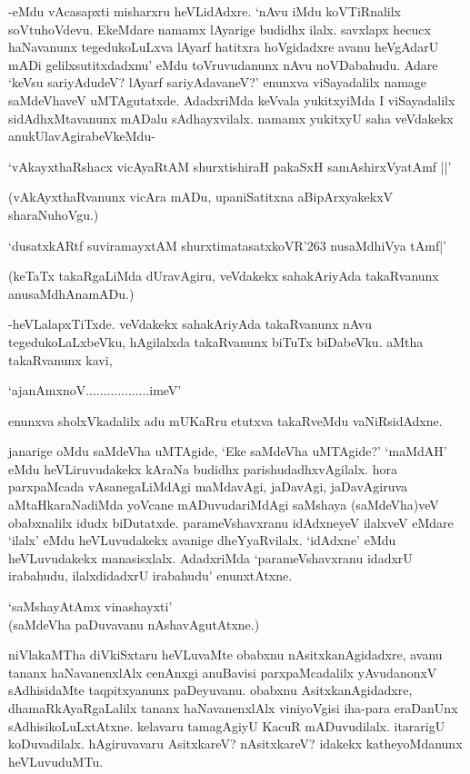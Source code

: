 -eMdu vAcasapxti misharxru heVLidAdxre. `nAvu iMdu koVTiRnalilx soVtuhoVdevu. EkeMdare namamx lAyarige budidhx ilalx. savxlapx hecucx haNavanunx tegedukoLuLxva lAyarf hatitxra hoVgidadxre avanu heVgAdarU mADi gelilxsutitxdadxnu' eMdu toVruvudanunx nAvu noVDabahudu. Adare `keVsu sariyAdudeV? lAyarf sariyAdavaneV?' enunxva viSayadalilx namage saMdeVhaveV uMTAgutatxde. AdadxriMda keVvala yukitxyiMda I viSayadalilx sidAdhxMtavanunx mADalu sAdhayxvilalx. namamx yukitxyU saha veVdakekx anukUlavAgirabeVkeMdu-

\begin{shloka}
`vAkayxthaRshacx vicAyaRtAM shurxtishiraH pakaSxH samAshirxVyatAmf ||'
\end{shloka}

(vAkAyxthaRvanunx vicAra mADu, upaniSatitxna aBipArxyakekxV sharaNuhoVgu.)

\begin{shloka}
`dusatxkARtf suviramayxtAM shurxtimatasatxkoVR\char'263 nusaMdhiVya tAmf|'
\end{shloka}

(keTaTx takaRgaLiMda dUravAgiru, veVdakekx sahakAriyAda takaRvanunx anusaMdhAnamADu.)

-heVLalapxTiTxde. veVdakekx sahakAriyAda takaRvanunx nAvu tegedukoLaLxbeVku, hAgilalxda takaRvanunx biTuTx biDabeVku. aMtha takaRvanunx kavi,

\begin{shloka}
`ajanAmxnoV..................imeV'
\end{shloka}

enunxva sholxVkadalilx adu mUKaRru etutxva takaRveMdu vaNiRsidAdxne.

janarige oMdu saMdeVha uMTAgide, `Eke saMdeVha uMTAgide?' `maMdAH' eMdu heVLiruvudakekx kAraNa budidhx parishudadhxvAgilalx. hora parxpaMcada vAsanegaLiMdAgi maMdavAgi, jaDavAgi, jaDavAgiruva aMtaHkaraNadiMda yoVcane mADuvudariMdAgi saMshaya (saMdeVha)veV obabxnalilx idudx biDutatxde. parameVshavxranu idAdxneyeV ilalxveV eMdare `ilalx' eMdu heVLuvudakekx avanige dheYyaRvilalx. `idAdxne' eMdu heVLuvudakekx manasisxlalx. AdadxriMda `parameVshavxranu idadxrU irabahudu, ilalxdidadxrU irabahudu' enunxtAtxne.

\begin{shloka}
`saMshayAtAmx vinashayxti'\\
(saMdeVha paDuvavanu nAshavAgutAtxne.)
\end{shloka}

niVlakaMTha diVkiSxtaru heVLuvaMte obabxnu nAsitxkanAgidadxre, avanu tananx haNavanenxlAlx cenAnxgi anuBavisi parxpaMcadalilx yAvudanonxV sAdhisidaMte taqpitxyanunx paDeyuvanu. obabxnu AsitxkanAgidadxre, dhamaRkAyaRgaLalilx tananx haNavanenxlAlx viniyoVgisi iha-para eraDanUnx sAdhisikoLuLxtAtxne. kelavaru tamagAgiyU KacuR mADuvudilalx. itararigU koDuvadilalx. hAgiruvavaru AsitxkareV? nAsitxkareV? idakekx katheyoMdanunx heVLuvuduMTu.

